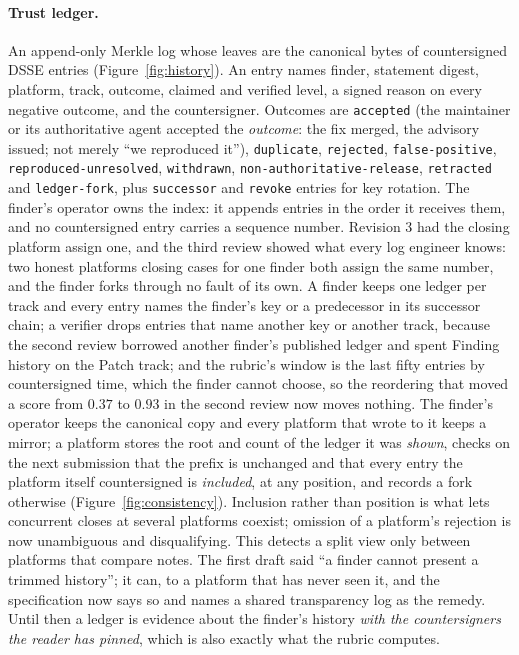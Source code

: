 \documentclass[11pt]{article}
\begin{document}
\paragraph{Trust ledger.} An append-only Merkle log whose leaves are the canonical bytes of countersigned
DSSE entries (Figure~\ref{fig:history}). An entry names finder, statement digest, platform, track, outcome,
claimed and verified level, a signed reason on every negative outcome, and the countersigner. Outcomes are
\texttt{accepted} (the maintainer or its authoritative agent accepted the \emph{outcome}: the fix merged, the
advisory issued; not merely ``we reproduced it''), \texttt{duplicate}, \texttt{rejected}, \texttt{false-positive},
\texttt{reproduced-unresolved}, \texttt{withdrawn}, \texttt{non-authoritative-release}, \texttt{retracted} and
\texttt{ledger-fork}, plus \texttt{successor} and \texttt{revoke} entries for key rotation. The finder's operator
owns the index: it appends entries in the order it receives them, and no countersigned entry carries a sequence
number. Revision 3 had the closing platform assign one, and the third review showed what every log engineer knows:
two honest platforms closing cases for one finder both assign the same number, and the finder forks through no fault
of its own. A finder keeps one ledger per track and every entry names the finder's key or a predecessor in its
successor chain; a verifier drops entries that name another key or another track, because the second review borrowed
another finder's published ledger and spent Finding history on the Patch track; and the rubric's window is the last
fifty entries by countersigned time, which the finder cannot choose, so the reordering that moved a score from $0.37$
to $0.93$ in the second review now moves nothing. The finder's operator keeps the canonical copy and every platform
that wrote to it keeps a mirror; a platform stores the root and count of the ledger it was \emph{shown}, checks on
the next submission that the prefix is unchanged and that every entry the platform itself countersigned is
\emph{included}, at any position, and records a fork otherwise (Figure~\ref{fig:consistency}). Inclusion rather than
position is what lets concurrent closes at several platforms coexist; omission of a platform's rejection is now
unambiguous and disqualifying. This detects a split view only between platforms that compare notes. The first draft said ``a finder cannot present a trimmed history''; it
can, to a platform that has never seen it, and the specification now says so and names a shared transparency
log as the remedy. Until then a ledger is evidence about the finder's history \emph{with the countersigners the
reader has pinned}, which is also exactly what the rubric computes.
\end{document}
